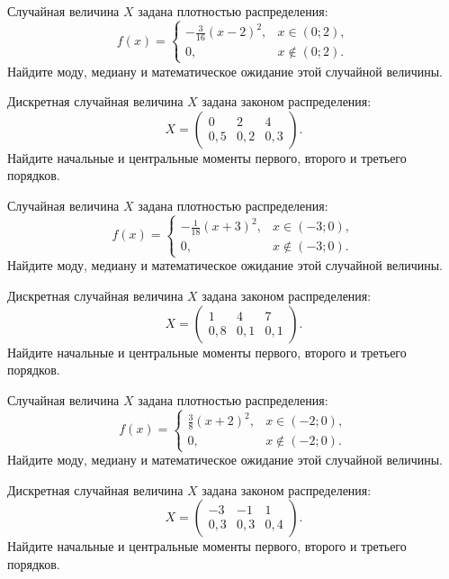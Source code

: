 \vfill

\newpage\setcounter{zad}{0}

\z Случайная величина $X$ задана плотностью распределения: $$f(x) = \begin{cases} -\frac{3}{16}(x-2)^2, & x \in (0; 2), \\ 0, & x \not\in (0; 2). \end{cases}$$ Найдите моду, медиану и математическое ожидание этой случайной величины.


\vfill

\z Дискретная случайная величина $X$ задана законом распределения: $$ X = \left(\begin{array}{rrr}0 & 2 & 4\\0{,}5 & 0{,}2 & 0{,}3\end{array}\right).$$ Найдите начальные и центральные моменты первого, второго и третьего порядков.
 

\vfill

\newpage\setcounter{zad}{0}

\z Случайная величина $X$ задана плотностью распределения: $$f(x) = \begin{cases} -\frac{1}{18}(x+3)^2, & x \in (-3; 0), \\ 0, & x \not\in (-3; 0). \end{cases}$$ Найдите моду, медиану и математическое ожидание этой случайной величины.


\vfill

\z Дискретная случайная величина $X$ задана законом распределения: $$ X = \left(\begin{array}{rrr}1 & 4 & 7\\0{,}8 & 0{,}1 & 0{,}1\end{array}\right).$$ Найдите начальные и центральные моменты первого, второго и третьего порядков.
 

\vfill

\newpage\setcounter{zad}{0}

\z Случайная величина $X$ задана плотностью распределения: $$f(x) = \begin{cases} \frac{3}{8}(x+2)^2, & x \in (-2; 0), \\ 0, & x \not\in (-2; 0). \end{cases}$$ Найдите моду, медиану и математическое ожидание этой случайной величины.


\vfill

\z Дискретная случайная величина $X$ задана законом распределения: $$ X = \left(\begin{array}{rrr}-3 & -1 & 1\\0{,}3 & 0{,}3 & 0{,}4\end{array}\right).$$ Найдите начальные и центральные моменты первого, второго и третьего порядков.
 

